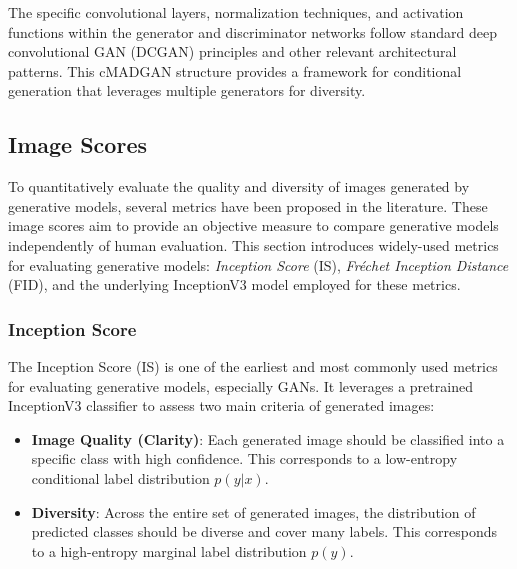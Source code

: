 The specific convolutional layers, normalization techniques, and activation functions within the generator and discriminator networks follow standard deep convolutional GAN (DCGAN) \cite{Radford2015DCGAN} principles and other relevant architectural patterns. This cMADGAN structure provides a framework for conditional generation that leverages multiple generators for diversity.





\subsection{Image Scores}\label{theoretical_image_scores}

To quantitatively evaluate the quality and diversity of images generated by generative models, several metrics have been proposed in the literature. These image scores aim to provide an objective measure to compare generative models independently of human evaluation. This section introduces widely-used metrics for evaluating generative models: \textit{Inception Score} (IS), \textit{Fréchet Inception Distance} (FID), and the underlying InceptionV3 model employed for these metrics.

\subsubsection[Inception Score - IS]{Inception Score}
The Inception Score (IS) \cite{salimans2016improvedtechniquestraininggans} is one of the earliest and most commonly used metrics for evaluating generative models, especially GANs. It leverages a pretrained InceptionV3 classifier to assess two main criteria of generated images:

\begin{itemize}
    \item \textbf{Image Quality (Clarity)}: Each generated image should be classified into a specific class with high confidence. This corresponds to a low-entropy conditional label distribution \( p(y|x) \).
    \item \textbf{Diversity}: Across the entire set of generated images, the distribution of predicted classes should be diverse and cover many labels. This corresponds to a high-entropy marginal label distribution \( p(y) \).
\end{itemize}

